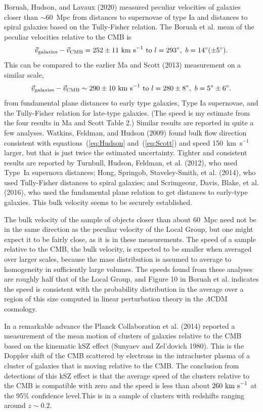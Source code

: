 \documentclass[fleqn,12pt]{article}
\newcommand{\beq}{\begin{equation}}
\newcommand{\eeq}{\end{equation}}
\begin{document}
Boruah, Hudson, and Lavaux (2020) measured peculiar velocities of galaxies closer than $\sim 60$~Mpc from distances to supernovae of type Ia and distances to spiral galaxies based on the Tully-Fisher relation. The Boruah et al. mean of the peculiar velocities relative to the CMB is 
\beq
{\vec v}_{\rm galaxies} - {\vec v}_{\rm CMB}= 252 \pm 11\hbox{ km s}^{-1}\hbox{ to } l = 293^\circ,\ b=14^\circ  (\pm 5^\circ).\label{eq:Hudson}
\eeq
This can be compared to the earlier Ma and Scott (2013) measurement on a similar scale, 
\beq
{\vec v}_{\rm galaxies} - {\vec v}_{\rm CMB}\sim 290\pm 10 \hbox{ km s}^{-1}\hbox{ to } l = 280\pm 8^\circ,\ b=5^\circ \pm 6^\circ.\label{eq:Scott}
\eeq
from fundamental plane distances to early type galaxies, Type Ia supernovae, and the Tully-Fisher relation for late-type galaxies. (The speed is my estimate from the four results in Ma and Scott Table 2.) Similar results are reported in quite a few analyses. Watkins, Feldman, and Hudson (2009) found bulk flow direction consistent with equations~(\ref{eq:Hudson} and~(\ref{eq:Scott}) and speed 150~km~s$^{-1}$ larger, but that is just twice the estimated uncertainty. Tighter and consistent results are reported by Turnbull, Hudson, Feldman, et al. (2012), who used Type~Ia supernova distances; Hong, Springob, Staveley-Smith, et al. (2014), who used Tully-Fisher distances to spiral galaxies; and Scrimgeour, Davis, Blake, et al. (2016), who used the fundamental plane relation to get distances to early-type galaxies. This bulk velocity seems to be securely established.

The bulk velocity of the sample of objects closer than about 60~Mpc need not be in the same direction as the peculiar velocity of the Local Group, but one might expect it to be fairly close, as it is in these measurements. The speed of a sample relative to the CMB, the bulk velocity, is expected to be smaller when averaged over larger scales, because the mass distribution is assumed to average to homogeneity in sufficiently large volumes. The speeds found from these analyses are roughly half that of the Local Group, and Figure 10 in Boruah et al. indicates the speed is consistent with the probability distribution in the average over a region of this size computed in linear perturbation theory in the $\Lambda$CDM cosmology.  

In a remarkable advance the Planck Collaboration et al. (2014) reported a measurement of the mean motion of clusters of galaxies relative to the CMB based on the kinematic  kSZ effect (Sunyaev and Zel'dovich 1980). This is the Doppler shift of the CMB scattered by electrons in the intracluster plasma of a cluster of galaxies that is moving relative to the CMB. The conclusion from detections of this kSZ effect is that the average speed of the clusters relative to the CMB is compatible with zero and the speed is less than about $260\hbox{ km s}^{-1}$ at the 95\% confidence level.This is in a sample of clusters with redshifts ranging around $z\sim 0.2$. 
\end{document}
